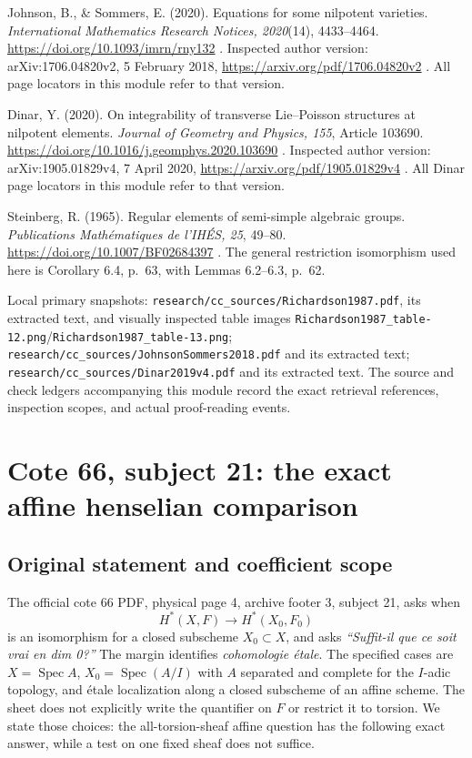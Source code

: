 \documentclass[11pt,a4paper]{article}
\theoremstyle{definition}\newtheorem{definition}[theorem]{Definition}
\theoremstyle{remark}\newtheorem{remark}[theorem]{Remark}
\begin{document}
Johnson, B., \& Sommers, E. (2020). Equations for some nilpotent varieties. \emph{International Mathematics Research Notices, 2020}(14), 4433--4464. \url{https://doi.org/10.1093/imrn/rny132} . Inspected author version: arXiv:1706.04820v2, 5 February 2018, \url{https://arxiv.org/pdf/1706.04820v2} . All page locators in this module refer to that version.

Dinar, Y. (2020). On integrability of transverse Lie--Poisson structures at nilpotent elements. \emph{Journal of Geometry and Physics, 155}, Article 103690. \url{https://doi.org/10.1016/j.geomphys.2020.103690} . Inspected author version: arXiv:1905.01829v4, 7 April 2020, \url{https://arxiv.org/pdf/1905.01829v4} . All Dinar page locators in this module refer to that version.

Steinberg, R. (1965). Regular elements of semi-simple algebraic groups. \emph{Publications Mathématiques de l'IHÉS, 25}, 49--80. \url{https://doi.org/10.1007/BF02684397} . The general restriction isomorphism used here is Corollary 6.4, p.~63, with Lemmas 6.2--6.3, p.~62.

Local primary snapshots: \texttt{research/cc\_sources/Richardson1987.pdf}, its extracted text, and visually inspected table images \nolinkurl{Richardson1987_table-12.png}/\nolinkurl{Richardson1987_table-13.png}; \texttt{research/cc\_sources/JohnsonSommers2018.pdf} and its extracted text; \texttt{research/cc\_sources/Dinar2019v4.pdf} and its extracted text. The source and check ledgers accompanying this module record the exact retrieval references, inspection scopes, and actual proof-reading events.


\section{Cote 66, subject 21: the exact affine henselian comparison}

\subsection{Original statement and coefficient scope}
The official cote 66 PDF, physical page 4, archive footer 3, subject 21,
asks when
\[
 H^*(X,F)\longrightarrow H^*(X_0,F_0)
\]
is an isomorphism for a closed subscheme $X_0\subset X$, and asks
\emph{``Suffit-il que ce soit vrai en dim 0?''}
The margin identifies \emph{cohomologie \'etale}. The specified cases
are $X=\operatorname{Spec}A$, $X_0=\operatorname{Spec}(A/I)$ with
$A$ separated and complete for the $I$-adic topology, and \'etale
localization along a closed subscheme of an affine scheme.
The sheet does not explicitly write the quantifier on $F$ or restrict
it to torsion. We state those choices: the all-torsion-sheaf affine
question has the following exact answer, while a test on one fixed
sheaf does not suffice.
\end{document}
